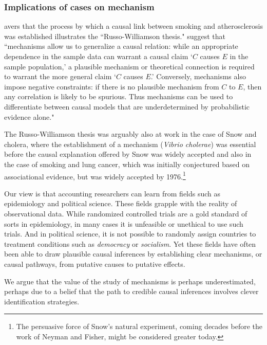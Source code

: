 \documentclass[11pt,reqno,titlepage]{amsart}
\begin{document}
\begin{doublespace}
\subsubsection{Implications of cases on mechanism}
 \citet{Gillies2011-GILTRT-3} avers that the process by which a causal link between smoking and atherosclerosis was established illustrates the ``Russo-Williamson thesis."
 \citet[p.\,159]{Russo:2007iz} suggest that ``mechanisms allow us to generalize a causal relation: while an appropriate dependence in the sample data can warrant a causal claim `$C$ causes $E$ in the sample population,' a plausible mechanism or theoretical connection is required to warrant the more general claim `$C$ causes $E$.' Conversely, mechanisms also impose negative constraints: if there is no plausible mechanism from $C$ to $E$, then any correlation is likely to be spurious. Thus mechanisms can be used to differentiate between causal models that are underdetermined by probabilistic evidence alone."

The Russo-Williamson thesis was arguably also at work in the case of Snow and cholera, where the establishment of a mechanism (\emph{Vibrio cholerae}) was essential before the causal explanation offered by Snow was widely accepted and also in the case of smoking and lung cancer, which was initially conjectured based on associational evidence, but was widely accepted by 1976.\footnote{
The persuasive force of Snow's natural experiment, coming decades before the work of Neyman and Fisher, might be considered greater today.}

Our view is that accounting researchers can learn from fields such as epidemiology and political science. 
These fields grapple with the reality of observational data.
While randomized controlled trials are a gold standard of sorts in epidemiology, in many cases it is unfeasible or unethical to use such trials.
And in political science, it is not possible to randomly assign countries to treatment conditions such as \emph{democracy} or \emph{socialism}.
Yet these fields have often been able to draw plausible causal inferences by establishing clear mechanisms, or causal pathways, from putative causes to putative effects.

We argue that the value of the study of mechanisms is perhaps underestimated, perhaps due to a belief that the path to credible causal inferences involves clever identification strategies.


\end{doublespace}
\end{document}
